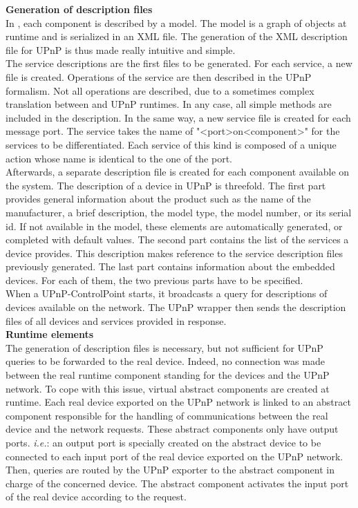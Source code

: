 {\bf Generation of description files}\\
In \enti{}, each component is described by a model. The model is a graph of objects at runtime and is serialized in an XML file. The generation of the XML description file for UPnP is thus made really intuitive and simple.\\
The service descriptions are the first files to be generated. For each \enti{} service, a new file is created. Operations of the service are then described in the UPnP formalism. Not all operations are described, due to a sometimes complex translation between \enti{} and UPnP runtimes. In any case, all simple methods are included in the description. In the same way, a new service file is created for each message port. The service takes the name of "<port>on<component>" for the services to be differentiated. Each service of this kind is composed of a unique action whose name is identical to the one of the port.\\
Afterwards, a separate description file is created for each component available on the system. The description of a device in UPnP is threefold. The first part provides general information about the product such as the name of the manufacturer, a brief description, the model type, the model number, or its serial id. If not available in the model, these elements are automatically generated, or completed with default values. The second part contains the list of the services a device provides. This description makes reference to the service description files previously generated. The last part contains information about the embedded devices. For each of them, the two previous parts have to be specified.\\

When a UPnP-ControlPoint starts, it broadcasts a query for descriptions of devices available on the network. The UPnP wrapper then sends the description files of all devices and services provided in response.\\

{\bf Runtime elements}\\
The generation of description files is necessary, but not sufficient for UPnP queries to be forwarded to the real device. Indeed, no connection was made between the real runtime component standing for the devices and the UPnP network. To cope with this issue, virtual abstract \enti{} components are created at runtime. Each real device exported on the UPnP network is linked to an abstract component responsible for the handling of communications between the real device and the network requests. These abstract components only have output ports. {\it i.e.}: an output port is specially created on the abstract device to be connected to each input port of the real device exported on the UPnP network.\\
Then, queries are routed by the UPnP exporter to the abstract component in charge of the concerned device. The abstract component activates the input port of the real device according to the request.\\

